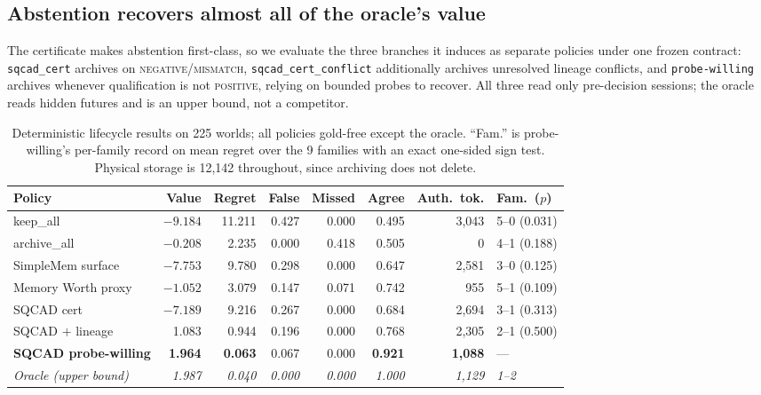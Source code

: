 \documentclass{article}
\newcommand{\SQCAD}{\textsc{SQCAD}}
\begin{document}
\subsection{Abstention recovers almost all of the oracle's value}
\label{sec:abstain}
The certificate makes abstention first-class, so we evaluate the three branches it
induces as separate policies under one frozen contract: \texttt{sqcad\_cert}
archives on \textsc{negative}/\textsc{mismatch}, \texttt{sqcad\_cert\_conflict}
additionally archives unresolved lineage conflicts, and \texttt{probe-willing}
archives whenever qualification is not \textsc{positive}, relying on bounded probes
to recover. All three read only pre-decision sessions; the oracle reads hidden
futures and is an upper bound, not a competitor.

\begin{table}[t]
\caption{Deterministic lifecycle results on 225 worlds; all policies gold-free
except the oracle. ``Fam.'' is probe-willing's per-family record on mean regret over
the 9 families with an exact one-sided sign test. Physical storage is 12{,}142
throughout, since archiving does not delete.}
\label{tab:lifecycle_det}
\centering\small
\begin{tabular}{lrrrrrrl}
\toprule
Policy & Value & Regret & False & Missed & Agree & Auth.\ tok. & Fam.\ ($p$) \\
\midrule
keep\_all              & $-9.184$ & 11.211 & 0.427 & 0.000 & 0.495 & 3{,}043 & 5--0 (0.031) \\
archive\_all           & $-0.208$ & \phantom{0}2.235 & 0.000 & 0.418 & 0.505 & \phantom{3{,}}0 & 4--1 (0.188) \\
SimpleMem surface      & $-7.753$ & \phantom{0}9.780 & 0.298 & 0.000 & 0.647 & 2{,}581 & 3--0 (0.125) \\
Memory Worth proxy     & $-1.052$ & \phantom{0}3.079 & 0.147 & 0.071 & 0.742 & \phantom{0}955 & 5--1 (0.109) \\
\midrule
\SQCAD{} cert          & $-7.189$ & \phantom{0}9.216 & 0.267 & 0.000 & 0.684 & 2{,}694 & 3--1 (0.313) \\
\SQCAD{} $+$ lineage   & \phantom{$-$}1.083 & \phantom{0}0.944 & 0.196 & 0.000 & 0.768 & 2{,}305 & 2--1 (0.500) \\
\textbf{\SQCAD{} probe-willing} & \textbf{\phantom{$-$}1.964} & \textbf{\phantom{0}0.063} & 0.067 & 0.000 & \textbf{0.921} & \textbf{1{,}088} & --- \\
\midrule
\textit{Oracle (upper bound)} & \textit{1.987} & \textit{0.040} & \textit{0.000} & \textit{0.000} & \textit{1.000} & \textit{1{,}129} & \textit{1--2} \\
\bottomrule
\end{tabular}
\end{table}
\end{document}
